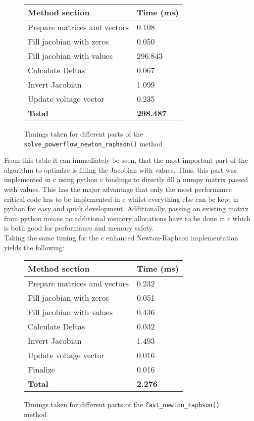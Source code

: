 \begin{figure}[H]
    \begin{center}
        \begin{tabular}{ll}
            \textbf{Method section} & \textbf{Time (ms)}\\
            \hline
            Prepare matrices and vectors & 0.108\\
            Fill jacobian with zeros &  0.050\\
            Fill jacobian with values & 296.843\\
            Calculate Deltas &      0.067\\
            Invert Jacobian &      1.099\\
            Update voltage vector & 0.235\\
            \hline
            \textbf{Total} & \textbf{298.487}
        \end{tabular}
    \end{center}
\caption{Timings taken for different parts of the \texttt{solve\_powerflow\_newton\_raphson()} method}
\end{figure}
    
From this table it can immediately be seen, that the most important part
of the algorithm to optimize is filling the Jacobian with values. Thus, this
part was implemented in c using python c bindings to directly fill a numpy
matrix passed with values. This has the major advantage that only the most performance
critical code has to be implemented in c whilst everything else can be kept in python
for easy and quick development. Additionally, passing an existing matrix from python
means no additional memory allocations have to be done in c which is both good for performance 
and memory safety.\\
Taking the same timing for the c enhanced Newton-Raphson implementation yields the following:

\begin{figure}[H]
    \begin{center}
        \begin{tabular}{ll}
            \textbf{Method section} & \textbf{Time (ms)}\\
            \hline
            Prepare matrices and vectors & 0.232\\
            Fill jacobian with zeros &  0.051\\
            Fill jacobian with values & 0.436\\
            Calculate Deltas &      0.032\\
            Invert Jacobian &      1.493\\
            Update voltage vector & 0.016\\
            Finalize & 0.016\\
            \hline
            \textbf{Total} & \textbf{2.276}
        \end{tabular}
    \end{center}
\caption{Timings taken for different parts of the \texttt{fast\_newton\_raphson()} method}
\end{figure}

